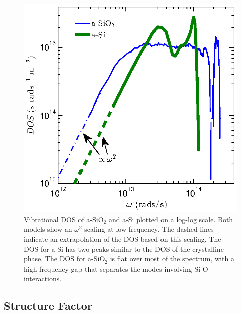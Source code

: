\documentclass[aps,prb,twocolumn,superscriptaddress,footinbib,amsmath,amssymb,floatfix]{revtex4}
\begin{document}
\begin{figure}
\begin{center}
\includegraphics[scale=1.0]
{fig2.eps}
\vspace*{-5mm}
\end{center}
\caption{\label{FIG:DOS} Vibrational DOS of a-SiO$_2$ and a-Si 
plotted on a log-log scale. 
Both models show an $\omega^{2}$ scaling at low frequency. The 
dashed lines indicate an extrapolation of the DOS based on this scaling. 
The DOS for a-Si has two peaks similar to the 
DOS of the crystalline phase.\cite{landry_effect_2010} 
The DOS for a-SiO$_2$ is flat over most of the spectrum, with a high 
frequency gap that separates 
the modes involving Si-O interactions.\cite{mcgaughey_thermal_2004} 
}
\end{figure}

\subsection{\label{S:Structure}Structure Factor}
\end{document}
